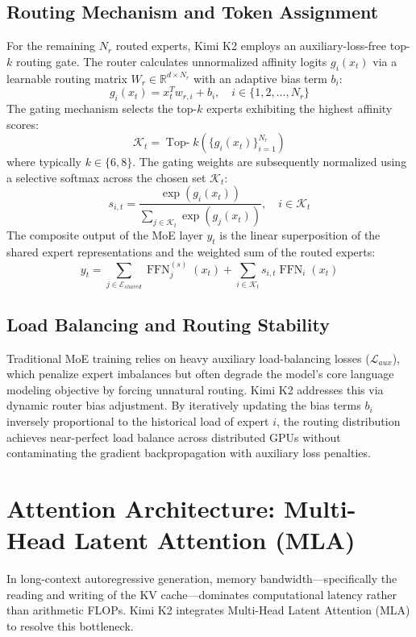 \documentclass[conference]{IEEEtran}
\begin{document}
\subsection{Routing Mechanism and Token Assignment}
For the remaining $N_r$ routed experts, Kimi K2 employs an auxiliary-loss-free top-$k$ routing gate. The router calculates unnormalized affinity logits $g_i(x_t)$ via a learnable routing matrix $W_r \in \mathbb{R}^{d \times N_r}$ with an adaptive bias term $b_i$:
\begin{equation}
g_i(x_t) = x_t^T w_{r,i} + b_i, \quad i \in \{1, 2, \dots, N_r\}
\end{equation}
The gating mechanism selects the top-$k$ experts exhibiting the highest affinity scores:
\begin{equation}
\mathcal{K}_t = \operatorname{Top-}k \left( \{ g_i(x_t) \}_{i=1}^{N_r} \right)
\end{equation}
where typically $k \in \{6, 8\}$. The gating weights are subsequently normalized using a selective softmax across the chosen set $\mathcal{K}_t$:
\begin{equation}
s_{i,t} = \frac{\exp(g_i(x_t))}{\sum_{j \in \mathcal{K}_t} \exp(g_j(x_t))}, \quad i \in \mathcal{K}_t
\end{equation}
The composite output of the MoE layer $y_t$ is the linear superposition of the shared expert representations and the weighted sum of the routed experts:
\begin{equation}
y_t = \sum_{j \in \mathcal{E}_{shared}} \operatorname{FFN}_j^{(s)}(x_t) + \sum_{i \in \mathcal{K}_t} s_{i,t} \operatorname{FFN}_i(x_t)
\end{equation}

\subsection{Load Balancing and Routing Stability}
Traditional MoE training relies on heavy auxiliary load-balancing losses ($\mathcal{L}_{aux}$), which penalize expert imbalances but often degrade the model's core language modeling objective by forcing unnatural routing. Kimi K2 addresses this via dynamic router bias adjustment. By iteratively updating the bias terms $b_i$ inversely proportional to the historical load of expert $i$, the routing distribution achieves near-perfect load balance across distributed GPUs without contaminating the gradient backpropagation with auxiliary loss penalties.

\section{Attention Architecture: Multi-Head Latent Attention (MLA)}
In long-context autoregressive generation, memory bandwidth—specifically the reading and writing of the KV cache—dominates computational latency rather than arithmetic FLOPs. Kimi K2 integrates Multi-Head Latent Attention (MLA) to resolve this bottleneck.
\end{document}

